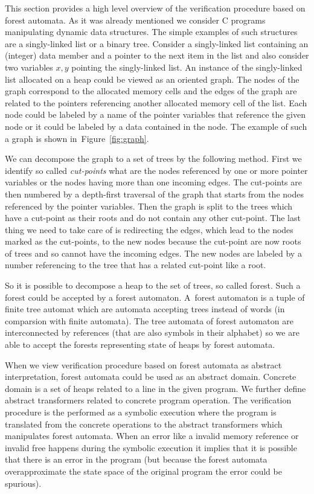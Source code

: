\documentclass[fleqn,11pt]{ExcelAtFIT} %
\begin{document}
This section provides a high level overview of the verification procedure based
on forest automata.
As it was already mentioned we consider C programs manipulating dynamic data structures.
The simple examples of such structures are a singly-linked list or a binary tree.
Consider a singly-linked list containing an (integer) data member and a pointer
to the next item in the list and also
consider two variables $x,y$ pointing the singly-linked list.
An instance of the singly-linked list allocated on a heap could be viewed as an oriented graph.
The nodes of the graph correspond to the allocated memory cells
and the edges of the graph are related to the pointers referencing
another allocated memory cell of the list.
Each node could be labeled by a name of the pointer variables that
reference the given node or it could be labeled by a data contained in the node.
The example of such a graph is shown in~Figure~\ref{fig:graph}.

We can decompose the graph to a set of trees by the following method.
First we identify so called \emph{cut-points} what are the nodes referenced by
one or more pointer variables or the nodes having more than one incoming edges.
The cut-points are then numbered by a depth-first traversal of the graph that starts from
the nodes referenced by the pointer variables.
Then the graph is split to the trees which have a cut-point as their roots and do not
contain any other cut-point.
The last thing we need to take care of is redirecting the edges, which lead to the nodes
marked as the cut-points, to the new nodes because the cut-point are now roots of trees and
so cannot have the incoming edges.
The new nodes are labeled by a number referencing to the tree that has a related cut-point like a root.

So it is possible to decompose a heap to the set of trees, so called forest.
Such a forest could be accepted by a forest automaton.
A~forest automaton is a tuple of finite tree automat which are automata accepting trees instead of words (in comparsion with finite automata).
The tree automata of forest automaton are interconnected by references (that are also symbols in their alphabet)
so we are able to accept the forests representing state of heaps by forest automata.

When we view verification procedure based on forest automata as abstract interpretation,
forest automata could be used as an abstract domain.
Concrete domain is a set of heaps related to a line in the given program.
We further define abstract transformers related to concrete program operation.
The verification procedure is the performed as a symbolic execution where the program
is translated from the concrete operations to the abstract transformers which manipulates
forest automata.
When an error like a invalid memory reference or invalid free happens during the symbolic
execution it implies that it is possible that there is an error in the program (but because
the forest automata overapproximate the state space of the original program the error could be spurious).
\end{document}
